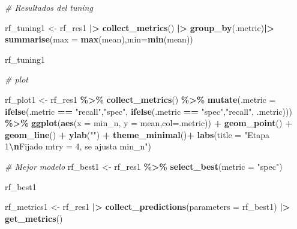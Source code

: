 \documentclass[12pt,a4paper,]{book}
\newenvironment{Shaded}{\begin{snugshade}}{\end{snugshade}}
\newcommand{\AttributeTok}[1]{\textcolor[rgb]{0.13,0.29,0.53}{#1}}
\newcommand{\CommentTok}[1]{\textcolor[rgb]{0.56,0.35,0.01}{\textit{#1}}}
\newcommand{\FunctionTok}[1]{\textcolor[rgb]{0.13,0.29,0.53}{\textbf{#1}}}
\newcommand{\NormalTok}[1]{#1}
\newcommand{\OtherTok}[1]{\textcolor[rgb]{0.56,0.35,0.01}{#1}}
\newcommand{\SpecialCharTok}[1]{\textcolor[rgb]{0.81,0.36,0.00}{\textbf{#1}}}
\newcommand{\StringTok}[1]{\textcolor[rgb]{0.31,0.60,0.02}{#1}}
\numberwithin{dummy}{section}
\theoremstyle{ocrenumbox}
\theoremstyle{blacknumex}
\theoremstyle{blacknumbox}
\theoremstyle{ocrenum}
\theoremstyle{ocrenum}
\begin{document}
\begin{Shaded}
\begin{Highlighting}[]
\CommentTok{\# Resultados del tuning}

\NormalTok{rf\_tuning1 }\OtherTok{\textless{}{-}}\NormalTok{ rf\_res1 }\SpecialCharTok{|\textgreater{}} 
  \FunctionTok{collect\_metrics}\NormalTok{() }\SpecialCharTok{|\textgreater{}} 
  \FunctionTok{group\_by}\NormalTok{(.metric)}\SpecialCharTok{|\textgreater{}} 
  \FunctionTok{summarise}\NormalTok{(}\AttributeTok{max =} \FunctionTok{max}\NormalTok{(mean),}\AttributeTok{min=}\FunctionTok{min}\NormalTok{(mean))}

\NormalTok{rf\_tuning1}

\CommentTok{\# plot}

\NormalTok{rf\_plot1 }\OtherTok{\textless{}{-}} 
\NormalTok{  rf\_res1 }\SpecialCharTok{\%\textgreater{}\%} 
  \FunctionTok{collect\_metrics}\NormalTok{() }\SpecialCharTok{\%\textgreater{}\%}  
  \FunctionTok{mutate}\NormalTok{(}\AttributeTok{.metric =} \FunctionTok{ifelse}\NormalTok{(.metric }\SpecialCharTok{==} \StringTok{"recall"}\NormalTok{,}\StringTok{"spec"}\NormalTok{,}
                          \FunctionTok{ifelse}\NormalTok{(.metric }\SpecialCharTok{==} \StringTok{"spec"}\NormalTok{,}\StringTok{"recall"}\NormalTok{,}
\NormalTok{                                 .metric))) }\SpecialCharTok{\%\textgreater{}\%} 
  \FunctionTok{ggplot}\NormalTok{(}\FunctionTok{aes}\NormalTok{(}\AttributeTok{x =}\NormalTok{ min\_n, }\AttributeTok{y =}\NormalTok{ mean,}\AttributeTok{col=}\NormalTok{.metric)) }\SpecialCharTok{+} 
  \FunctionTok{geom\_point}\NormalTok{() }\SpecialCharTok{+} 
  \FunctionTok{geom\_line}\NormalTok{() }\SpecialCharTok{+} 
  \FunctionTok{ylab}\NormalTok{(}\StringTok{""}\NormalTok{) }\SpecialCharTok{+}
  \FunctionTok{theme\_minimal}\NormalTok{()}\SpecialCharTok{+}
  \FunctionTok{labs}\NormalTok{(}\AttributeTok{title =} \StringTok{"Etapa 1}\SpecialCharTok{\textbackslash{}n}\StringTok{Fijado mtry = 4, se ajusta min\_n"}\NormalTok{)}


\CommentTok{\# Mejor modelo}
\NormalTok{rf\_best1 }\OtherTok{\textless{}{-}} 
\NormalTok{  rf\_res1 }\SpecialCharTok{\%\textgreater{}\%} 
  \FunctionTok{select\_best}\NormalTok{(}\AttributeTok{metric =} \StringTok{"spec"}\NormalTok{)}

\NormalTok{rf\_best1}

\NormalTok{rf\_metrics1 }\OtherTok{\textless{}{-}}\NormalTok{ rf\_res1 }\SpecialCharTok{|\textgreater{}} 
  \FunctionTok{collect\_predictions}\NormalTok{(}\AttributeTok{parameters =}\NormalTok{ rf\_best1) }\SpecialCharTok{|\textgreater{}} 
  \FunctionTok{get\_metrics}\NormalTok{()}


\end{Highlighting}
\end{Shaded}
\end{document}
